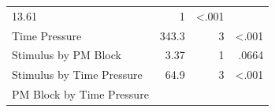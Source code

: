 \documentclass[11pt,]{article}
\begin{document}
\begin{longtable}[]{@{}lrrr@{}}
\begin{minipage}[t]{0.16\columnwidth}
13.61\strut
\end{minipage} & \begin{minipage}[t]{0.06\columnwidth}\raggedleft\strut
1\strut
\end{minipage} & \begin{minipage}[t]{0.06\columnwidth}\raggedleft\strut
\textless{}.001\strut
\end{minipage}\tabularnewline
\begin{minipage}[t]{0.36\columnwidth}\raggedright\strut
Time Pressure\strut
\end{minipage} & \begin{minipage}[t]{0.16\columnwidth}\raggedleft\strut
343.3\strut
\end{minipage} & \begin{minipage}[t]{0.06\columnwidth}\raggedleft\strut
3\strut
\end{minipage} & \begin{minipage}[t]{0.06\columnwidth}\raggedleft\strut
\textless{}.001\strut
\end{minipage}\tabularnewline
\begin{minipage}[t]{0.36\columnwidth}\raggedright\strut
Stimulus by PM Block\strut
\end{minipage} & \begin{minipage}[t]{0.16\columnwidth}\raggedleft\strut
3.37\strut
\end{minipage} & \begin{minipage}[t]{0.06\columnwidth}\raggedleft\strut
1\strut
\end{minipage} & \begin{minipage}[t]{0.06\columnwidth}\raggedleft\strut
.0664\strut
\end{minipage}\tabularnewline
\begin{minipage}[t]{0.36\columnwidth}\raggedright\strut
Stimulus by Time Pressure\strut
\end{minipage} & \begin{minipage}[t]{0.16\columnwidth}\raggedleft\strut
64.9\strut
\end{minipage} & \begin{minipage}[t]{0.06\columnwidth}\raggedleft\strut
3\strut
\end{minipage} & \begin{minipage}[t]{0.06\columnwidth}\raggedleft\strut
\textless{}.001\strut
\end{minipage}\tabularnewline
\begin{minipage}[t]{0.36\columnwidth}\raggedright\strut
PM Block by Time Pressure\strut

\end{minipage}
\end{longtable}
\end{document}
